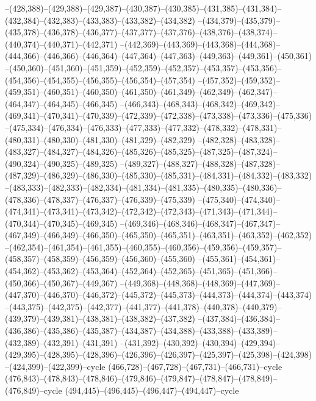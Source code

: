 --(428,388)--(429,388)--(429,387)--(430,387)--(430,385)--(431,385)--(431,384)--(432,384)--(432,383)--(433,383)--(433,382)--(434,382)
--(434,379)--(435,379)--(435,378)--(436,378)--(436,377)--(437,377)--(437,376)--(438,376)--(438,374)--(440,374)--(440,371)--(442,371)
--(442,369)--(443,369)--(443,368)--(444,368)--(444,366)--(446,366)--(446,364)--(447,364)--(447,363)--(449,363)--(449,361)--(450,361)
--(450,360)--(451,360)--(451,359)--(452,359)--(452,357)--(453,357)--(453,356)--(454,356)--(454,355)--(456,355)--(456,354)--(457,354)
--(457,352)--(459,352)--(459,351)--(460,351)--(460,350)--(461,350)--(461,349)--(462,349)--(462,347)--(464,347)--(464,345)--(466,345)
--(466,343)--(468,343)--(468,342)--(469,342)--(469,341)--(470,341)--(470,339)--(472,339)--(472,338)--(473,338)--(473,336)--(475,336)
--(475,334)--(476,334)--(476,333)--(477,333)--(477,332)--(478,332)--(478,331)--(480,331)--(480,330)--(481,330)--(481,329)--(482,329)
--(482,328)--(483,328)--(483,327)--(484,327)--(484,326)--(485,326)--(485,325)--(487,325)--(487,324)--(490,324)--(490,325)--(489,325)
--(489,327)--(488,327)--(488,328)--(487,328)--(487,329)--(486,329)--(486,330)--(485,330)--(485,331)--(484,331)--(484,332)--(483,332)
--(483,333)--(482,333)--(482,334)--(481,334)--(481,335)--(480,335)--(480,336)--(478,336)--(478,337)--(476,337)--(476,339)--(475,339)
--(475,340)--(474,340)--(474,341)--(473,341)--(473,342)--(472,342)--(472,343)--(471,343)--(471,344)--(470,344)--(470,345)--(469,345)
--(469,346)--(468,346)--(468,347)--(467,347)--(467,349)--(466,349)--(466,350)--(465,350)--(465,351)--(463,351)--(463,352)--(462,352)
--(462,354)--(461,354)--(461,355)--(460,355)--(460,356)--(459,356)--(459,357)--(458,357)--(458,359)--(456,359)--(456,360)--(455,360)
--(455,361)--(454,361)--(454,362)--(453,362)--(453,364)--(452,364)--(452,365)--(451,365)--(451,366)--(450,366)--(450,367)--(449,367)
--(449,368)--(448,368)--(448,369)--(447,369)--(447,370)--(446,370)--(446,372)--(445,372)--(445,373)--(444,373)--(444,374)--(443,374)
--(443,375)--(442,375)--(442,377)--(441,377)--(441,378)--(440,378)--(440,379)--(439,379)--(439,381)--(438,381)--(438,382)--(437,382)
--(437,384)--(436,384)--(436,386)--(435,386)--(435,387)--(434,387)--(434,388)--(433,388)--(433,389)--(432,389)--(432,391)--(431,391)
--(431,392)--(430,392)--(430,394)--(429,394)--(429,395)--(428,395)--(428,396)--(426,396)--(426,397)--(425,397)--(425,398)--(424,398)
--(424,399)--(422,399)--cycle
(466,728)--(467,728)--(467,731)--(466,731)--cycle
(476,843)--(478,843)--(478,846)--(479,846)--(479,847)--(478,847)--(478,849)--(476,849)--cycle
(494,445)--(496,445)--(496,447)--(494,447)--cycle
